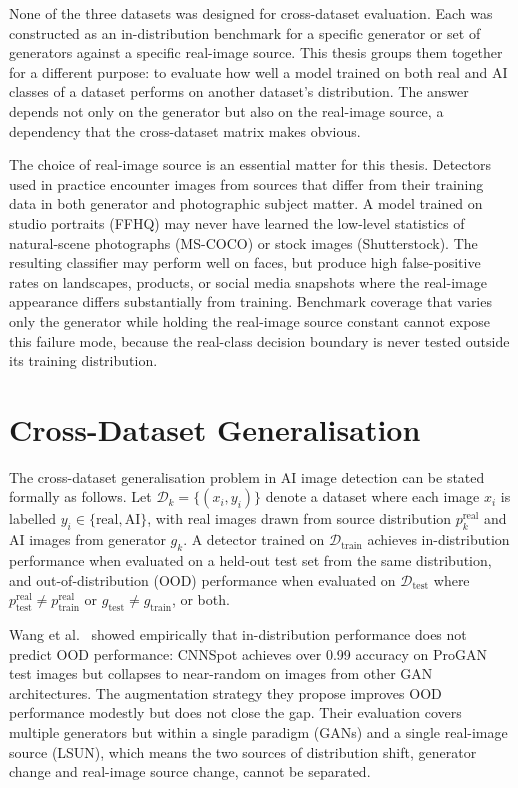 None of the three datasets was designed for cross-dataset evaluation. Each was
constructed as an in-distribution benchmark for a specific generator or set of generators
against a specific real-image source. This thesis groups them together for a different purpose: 
to evaluate how well a model trained on both real and AI classes of a 
dataset performs on another dataset's distribution. The answer depends not only on the
generator but also on the real-image source, a dependency that the cross-dataset matrix
makes obvious.

The choice of real-image source is an essential matter for this thesis. Detectors used
in practice encounter images from sources that differ from their training data in both
generator and photographic subject matter. A model trained on studio portraits (FFHQ)
may never have learned the low-level statistics of natural-scene photographs (MS-COCO)
or stock images (Shutterstock). The resulting classifier may perform well on faces, but
produce high false-positive rates on landscapes, products, or social media snapshots
where the real-image appearance differs substantially from training. Benchmark coverage
that varies only the generator while holding the real-image source constant cannot expose
this failure mode, because the real-class decision boundary is never tested outside its
training distribution.


\section{Cross-Dataset Generalisation}
\label{sec:cross_dataset_generalisation}

The cross-dataset generalisation problem in AI image detection can be stated formally as
follows. Let $\mathcal{D}_k = \{(x_i, y_i)\}$ denote a dataset where each image $x_i$
is labelled $y_i \in \{\text{real}, \text{AI}\}$, with real images drawn from source
distribution $p_k^{\text{real}}$ and AI images from generator $g_k$. A detector trained
on $\mathcal{D}_{\text{train}}$ achieves in-distribution performance when evaluated on a
held-out test set from the same distribution, and out-of-distribution (OOD) performance
when evaluated on $\mathcal{D}_{\text{test}}$ where $p_{\text{test}}^{\text{real}} \neq
p_{\text{train}}^{\text{real}}$ or $g_{\text{test}} \neq g_{\text{train}}$, or both.

Wang et al.~\cite{wang2020} showed empirically that in-distribution performance does not
predict OOD performance: CNNSpot achieves over 0.99 accuracy on ProGAN test images but
collapses to near-random on images from other GAN architectures. The augmentation
strategy they propose improves OOD performance modestly but does not close the gap. Their
evaluation covers multiple generators but within a single paradigm (GANs) and a single
real-image source (LSUN), which means the two sources of distribution shift, generator
change and real-image source change, cannot be separated.

